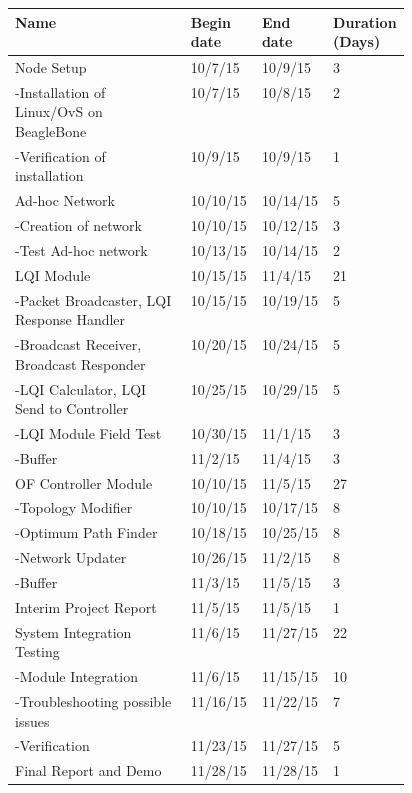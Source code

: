 \documentclass{article}
\begin{document}
\begin{tabular}{  | p{.45\linewidth} | p{0.185\linewidth} | p{0.185\linewidth} | p{0.09\linewidth} |}
\hline
\textbf{Name}	&	\textbf{Begin date}	&	\textbf{End date}	&	\textbf{Duration (Days)} \\
\hline
Node Setup	&	10/7/15	&	10/9/15	&	3 \\
-Installation of Linux/OvS on BeagleBone	&	10/7/15	&	10/8/15	&	2 \\
-Verification of installation	&	10/9/15	&	10/9/15	&	1 \\
\hline
Ad-hoc Network	&	10/10/15	&	10/14/15	&	5 \\
-Creation of network	&	10/10/15	&	10/12/15	&	3 \\
-Test Ad-hoc network	&	10/13/15	&	10/14/15	&	2 \\
\hline
LQI Module	&	10/15/15	&	11/4/15	&	21 \\
-Packet Broadcaster, LQI Response Handler	&	10/15/15	&	10/19/15	&	5 \\
-Broadcast Receiver, Broadcast Responder	&	10/20/15	&	10/24/15	&	5 \\ 
-LQI Calculator, LQI Send to Controller	&	10/25/15	&	10/29/15	&	5 \\
-LQI Module Field Test	&	10/30/15	&	11/1/15	&	3 \\
-Buffer	&	11/2/15	&	11/4/15	&	3 \\
\hline
OF Controller Module	&	10/10/15	&	11/5/15	&	27 \\
-Topology Modifier	&	10/10/15	&	10/17/15	&	8 \\
-Optimum Path Finder	&	10/18/15	&	10/25/15	&	8 \\
-Network Updater	&	10/26/15	&	11/2/15	&	8 \\ 
-Buffer	&	11/3/15	&	11/5/15	&	3 \\
\hline
Interim Project Report	&	11/5/15	&	11/5/15	&	1 \\
\hline
System Integration Testing	&	11/6/15	&	11/27/15	&	22 \\
-Module Integration	&	11/6/15	&	11/15/15	&	10 \\
-Troubleshooting possible issues	&	11/16/15	&	11/22/15	&	7 \\
-Verification	&	11/23/15	&	11/27/15	&	5 \\
\hline
Final Report and Demo	&	11/28/15	&	11/28/15	&	1 \\
\hline
\end{tabular}
\end{document}
